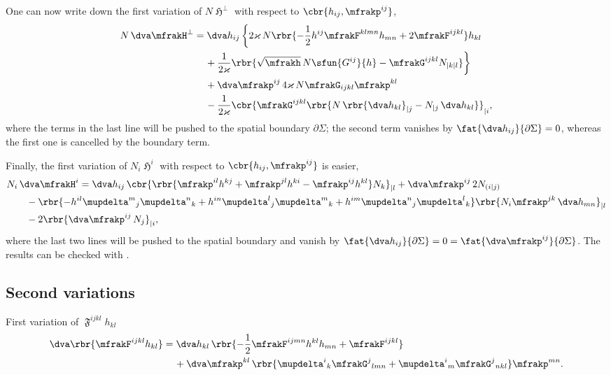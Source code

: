 \documentclass[a4paper,11pt]{article}
\begin{document}
One can now write down the first variation of $N\mfrakH^\perp$ with respect to 
$\cbr{h_{ij}, \mfrakp^{ij}}$,
\begin{align}
N\,\dva \mfrakH^\perp &= \dva h_{ij}\,\bigg\{
2\varkappa\,N\rbr{ -\frac{1}{2}h^{ij} \mfrakF^{klmn} h_{mn}
+ 2 \mfrakF^{ijkl}} h_{kl}
\nonumber \\
&\quad\,
+\frac{1}{2\varkappa}
\rbr{ \sqrt{\mfrakh}\,N\sfun{G^{ij}}{h}
-\mfrakG^{ijkl}N_{|k|l}}\bigg\}
\nonumber \\
&\quad\,
+\dva \mfrakp^{ij}\,4\varkappa\,N\mfrakG_{ijkl}\mfrakp^{kl}
\nonumber \\
&\quad\,
-\frac{1}{2\varkappa}
\cbr{\mfrakG^{ijkl}
\rbr{N\,\rbr{\dva h_{kl}}_{|j} - N_{|j}\,\dva h_{kl}} }_{|i},
\end{align}
where the terms in the last line will be pushed to the spatial boundary
$\partial\Sigma$; the second term vanishes by $\fat{\dva h_{ij}}{\partial\Sigma} 
= 0$, whereas the first one is cancelled by the boundary term.

Finally, the first variation of $N_i \mfrakH^i$ with respect to $\cbr{h_{ij},
\mfrakp^{ij}}$ is easier,
\begin{align}
&
N_i\,\dva \mfrakH^i = \dva h_{ij}\,
\cbr{\rbr{\mfrakp^{il}h^{kj}+\mfrakp^{jl}h^{ki}-\mfrakp^{ij}h^{kl}}N_k}_{|l}
+\dva \mfrakp^{ij}\,2N_{(i|j)}
\nonumber \\
&\qquad
- \rbr{-h^{il}\mupdelta^m{}_j\mupdelta^n{}_k
+h^{in}\mupdelta^l{}_j\mupdelta^m{}_k
+h^{im}\mupdelta^n{}_j\mupdelta^l{}_k}
\rbr{N_i\mfrakp^{jk}\,\dva h_{mn}}_{|l}
\nonumber \\
&\qquad
- 2\rbr{\dva \mfrakp^{ij}\,N_{j}}_{|i},
\end{align}
where the last two lines will be pushed to the spatial boundary and vanish by
$\fat{\dva h_{ij}}{\partial\Sigma} = 0 =
\fat{\dva \mfrakp^{ij}}{\partial\Sigma}$. The results can be checked with 
\cite[ch.\ 4.2.7]{Poisson2004}.

\subsection*{Second variations}

First variation of $\mfrakF^{ijkl}h_{kl}$
\begin{align}
\dva\rbr{\mfrakF^{ijkl}h_{kl}} &= \dva h_{kl}\,
\rbr{-\frac{1}{2}\mfrakF^{ijmn}h^{kl}h_{mn}+\mfrakF^{ijkl}}
\nonumber \\
&\quad\,
+\dva \mfrakp^{kl}\,\rbr{
\mupdelta^{i}{}_{k}\mfrakG^{j}{}_{lmn} +
\mupdelta^{i}{}_{m}\mfrakG^{j}{}_{nkl}}\mfrakp^{mn}.
\end{align}
\end{document}
